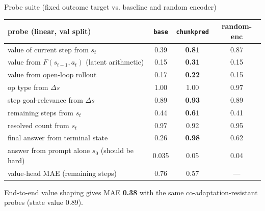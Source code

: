 \documentclass[aspectratio=169,10pt]{beamer}
\begin{document}
\begin{frame}{Probe suite (fixed outcome target vs. baseline and random encoder)}
\centering\scriptsize
\begin{tabular}{lccc}
\toprule
probe (linear, val split) & \texttt{base} & \texttt{chunkpred} & random-enc\\
\midrule
value of current step from $s_t$ & 0.39 & \textbf{0.81} & 0.87\\
value from $F(s_{t-1},a_t)$ (latent arithmetic) & 0.15 & \textbf{0.31} & 0.15\\
value from open-loop rollout & 0.17 & \textbf{0.22} & 0.15\\
op type from $\Delta s$ & 1.00 & 1.00 & 0.97\\
step goal-relevance from $\Delta s$ & 0.89 & \textbf{0.93} & 0.89\\
remaining steps from $s_t$ & 0.44 & \textbf{0.61} & 0.41\\
resolved count from $s_t$ & 0.97 & 0.92 & 0.95\\
final answer from terminal state & 0.26 & \textbf{0.98} & 0.62\\
answer from prompt alone $s_0$ (should be hard) & 0.035 & 0.05 & 0.04\\
\midrule
value-head MAE (remaining steps) & 0.76 & 0.57 & ---\\
\bottomrule
\end{tabular}

\medskip\small
End-to-end value shaping gives MAE \textbf{0.38} with the same
co-adaptation-resistant probes (state value 0.89).
\end{frame}
\end{document}
